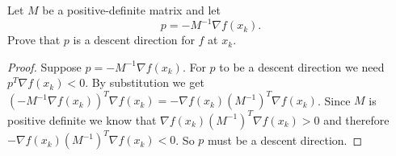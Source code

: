 \documentclass[12pt]{article}
\makeatletter
\theoremstyle{homework}
\newenvironment{exercise}[1]
{\def\@currentlabel{#1}\exercisecore}
{\endexercisecore}
\makeatother
\begin{document}
\begin{exercise}{4.4} Let $M$ be a positive-definite matrix and let 
  \begin{equation*}
    p = -M^{-1}\nabla f(x_k).
  \end{equation*}
  Prove that $p$ is a descent direction for $f$ at $x_k$. 
  \begin{proof} Suppose $p = -M^{-1}\nabla f(x_k)$. For $p$ to be a descent direction we need $p^T \nabla f(x_k) < 0$. By
    substitution we get $(-M^{-1}\nabla f(x_k))^T\nabla f(x_k) = -\nabla f(x_k)(M^{-1})^T\nabla f(x_k)$. Since $M$ is positive definite 
    we know that $\nabla f(x_k)(M^{-1})^T\nabla f(x_k) > 0$ and therefore $-\nabla f(x_k)(M^{-1})^T\nabla f(x_k) < 0$. So $p$ must be a descent direction. 
  \end{proof}
\end{exercise}
\vspace{.5in}
\end{document}
